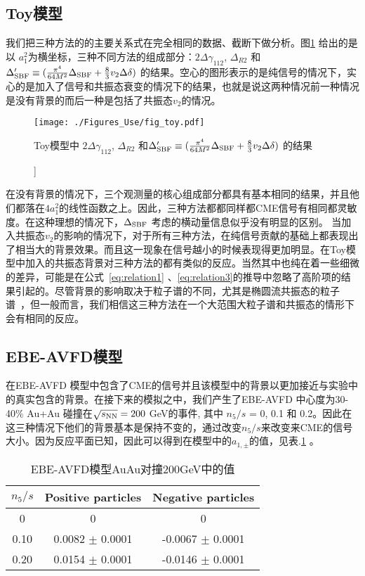 \subsection{Toy模型}
我们把三种方法的的主要关系式在完全相同的数据、截断下做分析。图\ref{fig:toya1} 给出的是以 $a_1^2$为横坐标，三种不同方法的组成部分：$2\Delta\gamma_{112}$, $\Delta_{R2}$ 和 $\Delta'_{\rm SBF}\equiv(\frac{\pi^4}{64M^2}\Delta_{\rm SBF}+\frac{8}{3}v_2\Delta\delta)$ 的结果。空心的图形表示的是纯信号的情况下，实心的是加入了信号和共振态衰变的情况下的结果，也就是说这两种情况前一种情况是没有背景的而后一种是包括了共振态$v_2$的情况。
\begin{figure}[bp] 
\centering
\texttt{[image: ./Figures\_Use/fig\_toy.pdf]}
\caption[三种方法核心组成部分在Toy模型中的结果]]{Toy模型中 $2\Delta\gamma_{112}$, $\Delta_{R2}$ 和$\Delta'_{\rm SBF}\equiv(\frac{\pi^4}{64M^2}\Delta_{\rm SBF}+\frac{8}{3}v_2\Delta\delta)$ 的结果}
\label{fig:toya1}
\end{figure}
在没有背景的情况下，三个观测量的核心组成部分都具有基本相同的结果，并且他们都落在$4a_1^2$的线性函数之上。因此，三种方法都都同样都CME信号有相同都灵敏度。在这种理想的情况下，$\Delta_{\rm SBF}$ 考虑的横动量信息似乎没有明显的区别。
当加入共振态$v_2$的影响的情况下，对于所有三种方法，在纯信号贡献的基础上都表现出了相当大的背景效果。而且这一现象在信号越小的时候表现得更加明显。在Toy模型中加入的共振态背景对三种方法的都有类似的反应。当然其中也纯在着一些细微的差异，可能是在公式~\ref{eq:relation1} 、\ref{eq:relation3}的推导中忽略了高阶项的结果引起的。尽管背景的影响取决于粒子谱的不同，尤其是椭圆流共振态的粒子谱~\cite{Feng:2018chm,Schlichting:2010qia,Pratt:2010zn}，但一般而言，我们相信这三种方法在一个大范围大粒子谱和共振态的情形下会有相同的反应。


\subsection{EBE-AVFD模型}
在EBE-AVFD 模型中包含了CME的信号并且该模型中的背景以更加接近与实验中的真实包含的背景。在接下来的模拟之中，我们产生了EBE-AVFD 中心度为30-40\% Au+Au 碰撞在$\sqrt{s_{\rm NN}} = 200$ GeV的事件, 其中 $n_{5}/s$ = 0, 0.1 和 0.2。因此在这三种情况下他们的背景基本是保持不变的，通过改变$n_{5}/s$来改变来CME的信号大小。因为反应平面已知，因此可以得到在模型中的$a_{1,\pm}$的值，见表.\ref{tab:Observeda1AuAu} 。
\begin{center}
\begin{table}[h]
\centering
\caption{ EBE-AVFD模型AuAu对撞200GeV中的值}
\begin{tabular}{c|c|c}
\toprule
 $n_{5}/s$    &  Positive particles      &   Negative particles   \\  
\hline
0   &  0 & 0 \\
0.10 &  0.0082   $\pm$ 0.0001   &  -0.0067 $\pm$ 0.0001  \\
0.20 &  0.0154   $\pm$ 0.0001   &  -0.0146 $\pm$ 0.0001  \\
\bottomrule
\end{tabular}
\label{tab:Observeda1AuAu}
\end{table}
\end{center}



